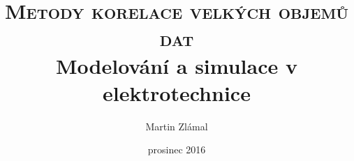 \documentclass[oneside,12pt,a4paper,final]{report} %
\begin{document}
\title{\textsc{Metody korelace velkých objemů dat}\\Modelování a simulace v elektrotechnice}
\author{Martin Zlámal}
\date{prosinec 2016}
\maketitle



\end{document}
